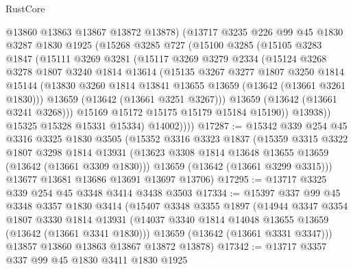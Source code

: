 \begin{lexlean}{RustCore}
\begin{coremodule}
            @13860
            @13863
            @13867
            @13872
            @13878)
          (@13717
            @3235
            @226
            @99
            @45
            @1830
            @3287
            @1830
            @1925
            (@15268
              @3285
              @727
              (@15100
                @3285
                (@15105
                  @3283
                  @1847
                  (@15111
                    @3269
                    @3281
                    (@15117
                      @3269
                      @3279
                      @2334
                      (@15124
                        @3268
                        @3278
                        @1807
                        @3240
                        @1814
                        @13614
                        (@15135
                          @3267
                          @3277
                          @1807
                          @3250
                          @1814
                          @15144
                          (@13830 @3260 @1814 @13841 @13655 @13659 (@13642 (@13661 @3261 @1830)))
                          @13659
                          (@13642 (@13661 @3251 @3267)))
                        @13659
                        (@13642 (@13661 @3241 @3268)))
                      @15169
                      @15172
                      @15175
                      @15179
                      @15184
                      @15190))
                  @13938))
              @15325
              @15328
              @15331
              @15334)
            @14002))))
@17287 := @15342
    @339
    @254
    @45
    @3316
    @3325
    @1830
    @3505
    (@15352
      @3316
      @3323
      @1837
      (@15359
        @3315
        @3322
        @1807
        @3298
        @1814
        @13931
        (@13623 @3308 @1814 @13648 @13655 @13659 (@13642 (@13661 @3309 @1830)))
        @13659
        (@13642 (@13661 @3299 @3315)))
      @13677
      @13681
      @13686
      @13691
      @13697
      @13706)
@17295 := @13717 @3325 @339 @254 @45 @3348 @3414 @3438 @3503
@17334 := @15397
    @337
    @99
    @45
    @3348
    @3357
    @1830
    @3414
    (@15407
      @3348
      @3355
      @1897
      (@14944
        @3347
        @3354
        @1807
        @3330
        @1814
        @13931
        (@14037 @3340 @1814 @14048 @13655 @13659 (@13642 (@13661 @3341 @1830)))
        @13659
        (@13642 (@13661 @3331 @3347)))
      @13857
      @13860
      @13863
      @13867
      @13872
      @13878)
@17342 := @13717 @3357 @337 @99 @45 @1830 @3411 @1830 @1925

\end{coremodule}
\end{lexlean}
